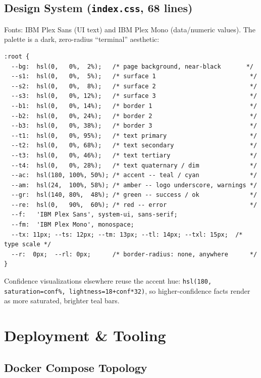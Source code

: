 \documentclass[11pt,a4paper]{report}
\newcommand{\code}[1]{\texttt{\small #1}}
\newcommand{\file}[1]{\texttt{\small\color{accent!70!black}#1}}
\begin{document}
\section{Design System (\file{index.css}, 68 lines)}

Fonts: IBM Plex Sans (UI text) and IBM Plex Mono (data/numeric values). The palette is a dark, zero-radius ``terminal'' aesthetic:

\begin{lstlisting}[caption={Root design tokens}]
:root {
  --bg:  hsl(0,   0%,  2%);   /* page background, near-black       */
  --s1:  hsl(0,   0%,  5%);   /* surface 1                          */
  --s2:  hsl(0,   0%,  8%);   /* surface 2                          */
  --s3:  hsl(0,   0%, 12%);   /* surface 3                          */
  --b1:  hsl(0,   0%, 14%);   /* border 1                           */
  --b2:  hsl(0,   0%, 24%);   /* border 2                           */
  --b3:  hsl(0,   0%, 38%);   /* border 3                           */
  --t1:  hsl(0,   0%, 95%);   /* text primary                       */
  --t2:  hsl(0,   0%, 68%);   /* text secondary                     */
  --t3:  hsl(0,   0%, 46%);   /* text tertiary                      */
  --t4:  hsl(0,   0%, 28%);   /* text quaternary / dim              */
  --ac:  hsl(180, 100%, 50%); /* accent -- teal / cyan              */
  --am:  hsl(24,  100%, 58%); /* amber -- logo underscore, warnings */
  --gr:  hsl(140, 80%,  48%); /* green -- success / ok              */
  --re:  hsl(0,   90%,  60%); /* red -- error                       */
  --f:   'IBM Plex Sans', system-ui, sans-serif;
  --fm:  'IBM Plex Mono', monospace;
  --tx: 11px; --ts: 12px; --tm: 13px; --tl: 14px; --txl: 15px;  /* type scale */
  --r:  0px;  --rl: 0px;      /* border-radius: none, anywhere      */
}
\end{lstlisting}

Confidence visualizations elsewhere reuse the accent hue: \code{hsl(180, saturation=conf\%, lightness=18+conf*32)}, so higher-confidence facts render as more saturated, brighter teal bars.

\chapter{Deployment \& Tooling}

\section{Docker Compose Topology}
\end{document}
